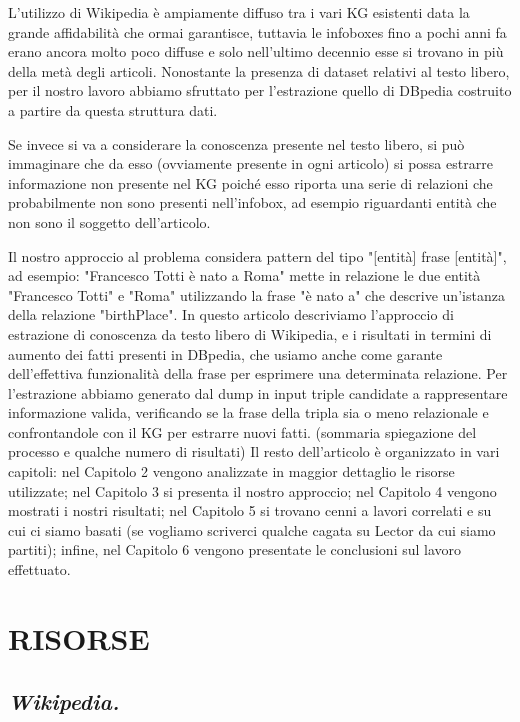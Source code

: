 \documentclass[10pt,a4paper,twocolumn]{article}
\begin{document}
L'utilizzo di Wikipedia è ampiamente diffuso tra i vari KG esistenti data la grande affidabilità che ormai garantisce, tuttavia le infoboxes fino a pochi anni fa erano ancora molto poco diffuse e solo nell'ultimo decennio esse si trovano in più della metà degli articoli. Nonostante la presenza di dataset relativi al testo libero, per il nostro lavoro abbiamo sfruttato per l'estrazione quello di DBpedia costruito a partire da questa struttura dati.

Se invece si va a considerare la conoscenza presente nel testo libero, si può immaginare che da esso (ovviamente presente in ogni articolo) si possa estrarre informazione non presente nel KG poiché esso riporta una serie di relazioni che probabilmente non sono presenti nell'infobox, ad esempio riguardanti entità che non sono il soggetto dell'articolo.

Il nostro approccio al problema considera pattern del tipo 
"[entità] frase [entità]", ad esempio: "Francesco Totti è nato a Roma" mette in relazione le due entità "Francesco Totti" e "Roma" utilizzando la frase "è nato a" che descrive un'istanza della relazione "birthPlace".
In questo articolo descriviamo l'approccio di estrazione di conoscenza da testo libero di Wikipedia, e i risultati in termini di aumento dei fatti presenti in DBpedia, che usiamo anche come garante dell'effettiva funzionalità della frase per esprimere una determinata relazione.
Per l'estrazione abbiamo generato dal dump in input triple candidate a rappresentare informazione valida, verificando se la frase della tripla sia o meno relazionale e confrontandole con il KG per estrarre nuovi fatti.
(sommaria spiegazione del processo e qualche numero di risultati)
Il resto dell'articolo è organizzato in vari capitoli: nel Capitolo 2 vengono analizzate in maggior dettaglio le risorse utilizzate; nel Capitolo 3 si presenta il nostro approccio; nel Capitolo 4 vengono mostrati i nostri risultati; nel Capitolo 5 si trovano cenni a lavori correlati e su cui ci siamo basati (se vogliamo scriverci qualche cagata su Lector da cui siamo partiti); infine, nel Capitolo 6 vengono presentate le conclusioni sul lavoro effettuato.

\section{RISORSE}
\subsection*{\textit{Wikipedia.}}
\end{document}

